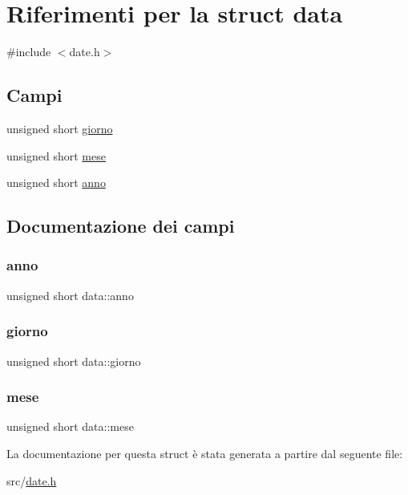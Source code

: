 \hypertarget{structdata}{}\section{Riferimenti per la struct data}
\label{structdata}


{\ttfamily \#include $<$date.\+h$>$}

\subsection*{Campi}
\begin{DoxyCompactItemize}
\item 
unsigned short \hyperlink{structdata_a7744504762d70b21c2dbc203073f37cb}{giorno}
\item 
unsigned short \hyperlink{structdata_ad2db25392e71879164c0bc860a04c8f6}{mese}
\item 
unsigned short \hyperlink{structdata_adf113999b62867f75d4c2e24f34567fd}{anno}
\end{DoxyCompactItemize}


\subsection{Documentazione dei campi}
\mbox{\label{structdata_adf113999b62867f75d4c2e24f34567fd}} 
\subsubsection{\texorpdfstring{anno}{anno}}
{\footnotesize\ttfamily unsigned short data\+::anno}

\mbox{\label{structdata_a7744504762d70b21c2dbc203073f37cb}} 
\subsubsection{\texorpdfstring{giorno}{giorno}}
{\footnotesize\ttfamily unsigned short data\+::giorno}

\mbox{\label{structdata_ad2db25392e71879164c0bc860a04c8f6}} 
\subsubsection{\texorpdfstring{mese}{mese}}
{\footnotesize\ttfamily unsigned short data\+::mese}



La documentazione per questa struct è stata generata a partire dal seguente file\+:\begin{DoxyCompactItemize}
\item 
src/\hyperlink{date_8h}{date.\+h}\end{DoxyCompactItemize}
